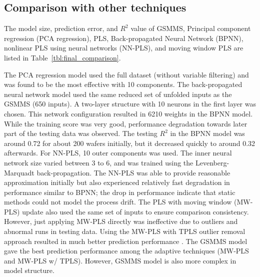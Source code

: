 \clearpage


\subsection{Comparison with other techniques}

The model size, prediction error, and $R^2$ value of GSMMS, Principal component regression (PCA regression), PLS, Back-propagated Neural Network (BPNN), nonlinear PLS using neural networks (NN-PLS), and moving window PLS are listed in Table~\ref{tbl:final_comparison}.


The PCA regression model used the full dataset (without
variable filtering) and was found to be the most effective with 10
components. The back-propagated neural network model used the same reduced set of
unfolded inputs as the GSMMS (650 inputs). A two-layer structure
with 10 neurons in the first layer was chosen. This network configuration resulted in 6210 weights in the BPNN model. While the training score was very good, performance degradation towards later part of the testing data was observed. The
testing $R^2$ in the BPNN model was around 0.72 for about 200 wafers
initially, but it decreased quickly to around 0.32 afterwards. For NN-PLS, 10
outer components was used. The inner neural network size varied between 3 to
6, and was trained using the Levenberg-Marquadt back-propagation. The NN-PLS
was able to provide reasonable approximation initially but also experienced
relatively fast degradation in performance similar to BPNN; the drop in
performance indicate that static methods could not model the process drift. The PLS
with moving window (MW-PLS) update also used the same set of inputs to ensure comparison consistency. However, just applying MW-PLS directly was ineffective due to outliers and abnormal
runs in testing data. Using the MW-PLS with TPLS outlier removal approach resulted in much better prediction performance \cite{Lu2014a}. The GSMMS model gave the best prediction
performance among the adaptive techniques (MW-PLS and MW-PLS w/ TPLS).
However, GSMMS model is also more complex in model structure.

